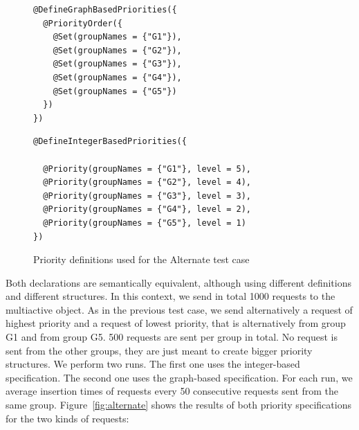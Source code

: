 \documentclass[11pt]{report}
\begin{document}
\begin{figure}[!ht]
	\lstset{language=java, numberstyle=\tiny, stepnumber=1, numbersep=5pt, basicstyle=\footnotesize}
	\begin{minipage}{0.41\textwidth}
	\begin{lstlisting}[frame=single]
@DefineGraphBasedPriorities({
  @PriorityOrder({
    @Set(groupNames = {"G1"}),
    @Set(groupNames = {"G2"}),
    @Set(groupNames = {"G3"}),
    @Set(groupNames = {"G4"}),
    @Set(groupNames = {"G5"})
  })
})
 	\end{lstlisting}
 	\end{minipage}
 	\nointerlineskip
	\begin{minipage}{0.57\textwidth}
	\begin{lstlisting}[frame=single]
@DefineIntegerBasedPriorities({

  @Priority(groupNames = {"G1"}, level = 5),
  @Priority(groupNames = {"G2"}, level = 4),
  @Priority(groupNames = {"G3"}, level = 3),
  @Priority(groupNames = {"G4"}, level = 2),
  @Priority(groupNames = {"G5"}, level = 1)
})
 	\end{lstlisting}
 	\end{minipage}	
	\caption{Priority definitions used for the Alternate test case}
	\label{fig:alternate-decl}
\end{figure}

Both declarations are semantically equivalent, although using different definitions and different structures. In this context, we send in total 1000 requests to the multiactive object. As in the previous test case, we send alternatively a request of highest priority and a request of lowest priority, that is alternatively from group G1 and from group G5. 500 requests are sent per group in total. No request is sent from the other groups, they are just meant to create bigger priority structures. We perform two runs. The first one uses the integer-based specification. The second one uses the graph-based specification. For each run, we average insertion times of requests every 50 consecutive requests sent from the same group. Figure~\ref{fig:alternate} shows the results of both priority specifications for the two kinds of requests:
\end{document}

